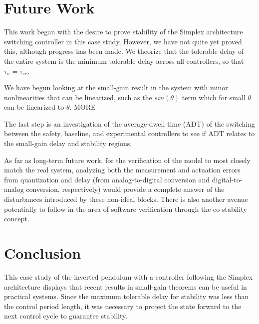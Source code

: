 \documentclass[conference]{IEEEtran}
\begin{document}


\section{Future Work}
This work began with the desire to prove stability of the Simplex architecture switching controller in this case study.  However, we have not quite yet proved this, although progress has been made.  We theorize that the tolerable delay of the entire system is the minimum tolerable delay across all controllers, so that $\tau_{\sigma}=\tau_{ec}$.

We have begun looking at the small-gain result in the system with minor nonlinearities that can be linearized, such as the $sin(\theta)$ term which for small $\theta$ can be linearized to $\theta$.  MORE

The last step is an investigation of the average-dwell time (ADT) of the switching between the safety, baseline, and experimental controllers to see if ADT relates to the small-gain delay and stability regions.

As far as long-term future work, for the verification of the model to most closely match the real system, analyzing both the measurement and actuation errors from quantization and delay (from analog-to-digital conversion and digital-to-analog conversion, respectively) would provide a complete answer of the disturbances introduced by these non-ideal blocks.  There is also another avenue potentially to follow in the area of software verification through the co-stability concept.

\section{Conclusion}
This case study of the inverted pendulum with a controller following the Simplex architecture displays that recent results in small-gain theorems can be useful in practical systems.  Since the maximum tolerable delay for stability was less than the control period length, it was necessary to project the state forward to the next control cycle to guarantee stability.
\end{document}
